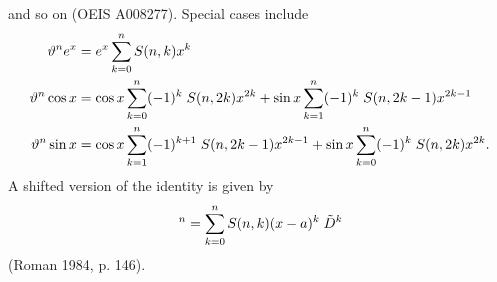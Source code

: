 \documentclass{article}
\begin{document}
and so on (OEIS A008277). Special cases include
\begin{align}
    \vartheta^n e^x &=e^x \sum_{k=0}^{n}S(n,k)x^k\\
    \vartheta^n \cos x &=\cos x \sum_{k=0}^{n}(-1)^k \hspace{0.1cm}S(n, 2k) x^{2k} + \sin x \sum_{k=1}^{n}(-1)^k \hspace{0.1cm} S(n,2k-1) x^{2k-1}\\
    \vartheta^n \sin x &=\cos x \sum_{k=1}^{n}(-1)^{k+1} \hspace{0.1cm}S(n, 2k - 1) x^{2k- 1} + \sin x \sum_{k=0}^{n}(-1)^k \hspace{0.1cm} S(n,2k) x^{2k}.
\end{align}
A shifted version of the identity is given by
\begin{align}
    [ \,(x-a) \Tilde{D} ] \,^n = \sum_{k=0}^{n} S(n,k)(x-a)^k \hspace{0.1cm}\Tilde{D}^k
\end{align}
(Roman 1984, p. 146).
 
\end{document}
